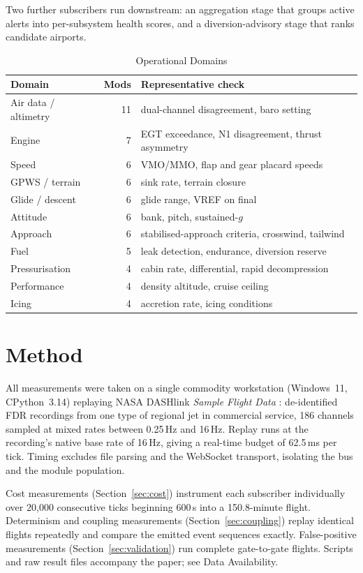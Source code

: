 \documentclass[conference]{IEEEtran}
\begin{document}
Two further subscribers run downstream: an aggregation stage that groups
active alerts into per-subsystem health scores, and a diversion-advisory stage
that ranks candidate airports.

\begin{table}[t]
\caption{Operational Domains}
\label{tab:domains}
\centering
\footnotesize
\begin{tabular}{@{}lrp{}@{}}
\toprule
\textbf{Domain} & \textbf{Mods} & \textbf{Representative check} \\
\midrule
Air data / altimetry & 11 & dual-channel disagreement, baro setting \\
Engine & 7 & EGT exceedance, N1 disagreement, thrust asymmetry \\
Speed & 6 & VMO/MMO, flap and gear placard speeds \\
GPWS / terrain & 6 & sink rate, terrain closure \\
Glide / descent & 6 & glide range, VREF on final \\
Attitude & 6 & bank, pitch, sustained-$g$ \\
Approach & 6 & stabilised-approach criteria, crosswind, tailwind \\
Fuel & 5 & leak detection, endurance, diversion reserve \\
Pressurisation & 4 & cabin rate, differential, rapid decompression \\
Performance & 4 & density altitude, cruise ceiling \\
Icing & 4 & accretion rate, icing conditions \\
\bottomrule
\end{tabular}
\end{table}

\section{Method}
\label{sec:method}

All measurements were taken on a single commodity workstation
(Windows~11, CPython~3.14) replaying NASA DASHlink \emph{Sample Flight Data}
\cite{dashlink}: de-identified FDR recordings from one type of regional jet in
commercial service, 186 channels sampled at mixed rates between 0.25\,Hz and
16\,Hz. Replay runs at the recording's native base rate of 16\,Hz, giving a
real-time budget of 62.5\,ms per tick. Timing excludes file parsing and the
WebSocket transport, isolating the bus and the module population.

Cost measurements (Section~\ref{sec:cost}) instrument each subscriber
individually over 20{,}000 consecutive ticks beginning 600\,s into a
150.8-minute flight. Determinism and coupling measurements
(Section~\ref{sec:coupling}) replay identical flights repeatedly and compare
the emitted event sequences exactly. False-positive measurements
(Section~\ref{sec:validation}) run complete gate-to-gate flights. Scripts and
raw result files accompany the paper; see Data Availability.
\end{document}
